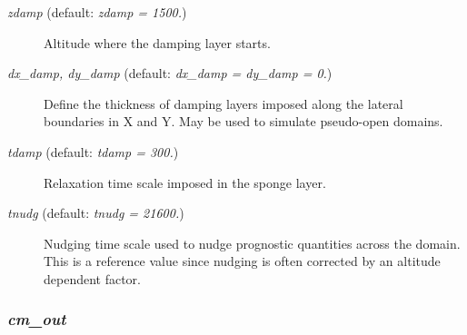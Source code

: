 \documentclass[12pt,A4,french]{article}
\begin{document}
\begin{description}
\item[{\it zdamp} (default: {\it zdamp = 1500.})]

Altitude where the damping layer starts.

\item[{\it dx\_damp, dy\_damp} (default: {\it dx\_damp = dy\_damp = 0.})]

Define the thickness of damping layers imposed along the lateral boundaries in X and Y. May be used to simulate pseudo-open domains.

\item[{\it tdamp} (default: {\it tdamp = 300.})]

Relaxation time scale imposed in the sponge layer.

\item[{\it tnudg} (default: {\it tnudg = 21600.})]

Nudging time scale used to nudge prognostic quantities across the domain. This is a reference value since nudging is often corrected by an altitude dependent factor.

\end{description}

\subsubsection{{\it cm\_out}}
\end{document}
